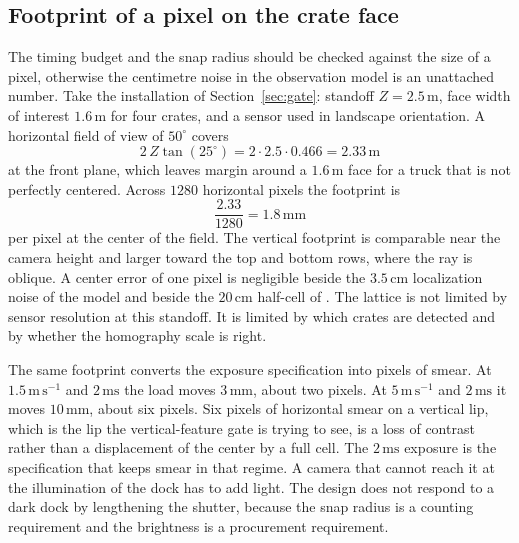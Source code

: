 \subsection{Footprint of a pixel on the crate face}
\label{sec:footprint}

The timing budget and the snap radius should be checked against the size of a pixel, otherwise the centimetre noise in the observation model is an unattached number. Take the installation of Section~\ref{sec:gate}: standoff $Z=2.5\,\mathrm{m}$, face width of interest $1.6\,\mathrm{m}$ for four crates, and a sensor used in landscape orientation. A horizontal field of view of $50^{\circ}$ covers
\begin{equation}
2\,Z\tan(25^{\circ}) = 2\cdot 2.5\cdot 0.466 = 2.33\,\mathrm{m}
\label{eq:fov}
\end{equation}
at the front plane, which leaves margin around a $1.6\,\mathrm{m}$ face for a truck that is not perfectly centered. Across $1280$ horizontal pixels the footprint is
\begin{equation}
\frac{2.33}{1280} = 1.8\,\mathrm{mm}
\label{eq:footprint}
\end{equation}
per pixel at the center of the field. The vertical footprint is comparable near the camera height and larger toward the top and bottom rows, where the ray is oblique. A center error of one pixel is negligible beside the $3.5\,\mathrm{cm}$ localization noise of the model and beside the $20\,\mathrm{cm}$ half-cell of . The lattice is not limited by sensor resolution at this standoff. It is limited by which crates are detected and by whether the homography scale is right.

The same footprint converts the exposure specification into pixels of smear. At $1.5\,\mathrm{m\,s^{-1}}$ and $2\,\mathrm{ms}$ the load moves $3\,\mathrm{mm}$, about two pixels. At $5\,\mathrm{m\,s^{-1}}$ and $2\,\mathrm{ms}$ it moves $10\,\mathrm{mm}$, about six pixels. Six pixels of horizontal smear on a vertical lip, which is the lip the vertical-feature gate is trying to see, is a loss of contrast rather than a displacement of the center by a full cell. The $2\,\mathrm{ms}$ exposure is the specification that keeps smear in that regime. A camera that cannot reach it at the illumination of the dock has to add light. The design does not respond to a dark dock by lengthening the shutter, because the snap radius is a counting requirement and the brightness is a procurement requirement.

